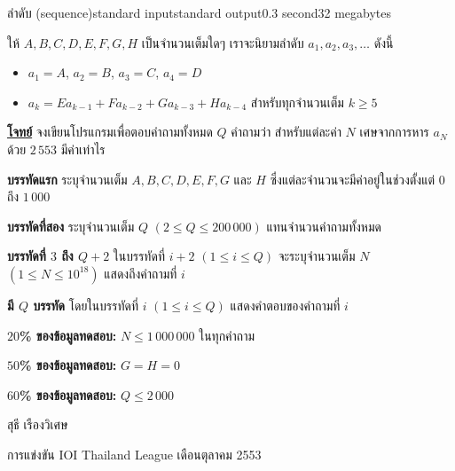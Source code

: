 \documentclass[11pt,a4paper]{article}
\begin{document}
\begin{problem}{ลำดับ (sequence)}{standard input}{standard output}{0.3 second}{32 megabytes}

ให้ $A, B, C, D, E, F, G, H$ เป็นจำนวนเต็มใดๆ เราจะนิยามลำดับ $a_1, a_2, a_3, …$ ดังนี้

\begin{itemize}

\item $a_1 = A$, $a_2 = B$, $a_3 = C$, $a_4 = D$
\item $a_k = Ea_{k-1} + Fa_{k-2} + Ga_{k-3} + Ha_{k-4}$ สำหรับทุกจำนวนเต็ม $k \geq 5$
\end{itemize}

\bigskip
\underline{\textbf{โจทย์}}  จงเขียนโปรแกรมเพื่อตอบคำถามทั้งหมด $Q$ คำถามว่า สำหรับแต่ละค่า $N$ เศษจากการหาร $a_N$ ด้วย $2\,553$ มีค่าเท่าไร


\InputFile

\textbf{บรรทัดแรก} ระบุจำนวนเต็ม $A, B, C, D, E, F, G$ และ $H$ ซึ่งแต่ละจำนวนจะมีค่าอยู่ในช่วงตั้งแต่ $0$ ถึง $1\,000$

\textbf{บรรทัดที่สอง} ระบุจำนวนเต็ม $Q$ $(2 \leq Q \leq 200\,000)$ แทนจำนวนคำถามทั้งหมด

\textbf{บรรทัดที่ $3$ ถึง $Q+2$} ในบรรทัดที่ $i+2$ $(1 \leq i \leq Q)$ จะระบุจำนวนเต็ม $N$ $(1 \leq N \leq 10^{18})$ แสดงถึงคำถามที่ $i$


\OutputFile

\textbf{มี $Q$ บรรทัด} โดยในบรรทัดที่ $i$ $(1 \leq i \leq Q)$ แสดงคำตอบของคำถามที่ $i$

\Examples

\begin{example}
%
%
\end{example}

\Scoring

\textbf{$20$\% ของข้อมูลทดสอบ:} $N \leq 1\,000\,000$ ในทุกคำถาม

\textbf{$50$\% ของข้อมูลทดสอบ:} $G = H = 0$

\textbf{$60$\% ของข้อมูลทดสอบ:} $Q \leq 2\,000$

\Source

สุธี เรืองวิเศษ

การแข่งขัน IOI Thailand League เดือนตุลาคม 2553

\end{problem}
\end{document}
